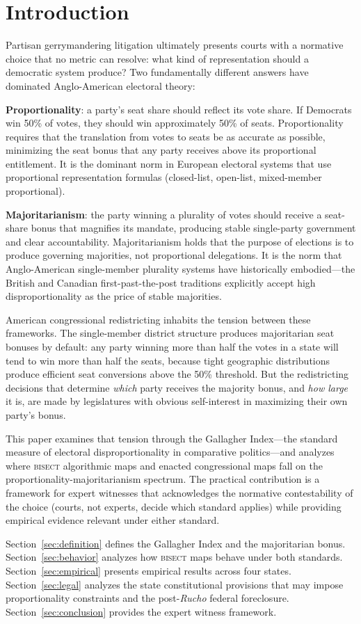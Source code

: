 \section{Introduction}
\label{sec:introduction}

Partisan gerrymandering litigation ultimately presents courts with a normative
choice that no metric can resolve: what kind of representation should a democratic
system produce? Two fundamentally different answers have dominated Anglo-American
electoral theory:

\textbf{Proportionality}: a party's seat share should reflect its vote share.
If Democrats win 50\% of votes, they should win approximately 50\% of seats.
Proportionality requires that the translation from votes to seats be as accurate
as possible, minimizing the seat bonus that any party receives above its proportional
entitlement. It is the dominant norm in European electoral systems that use proportional
representation formulas (closed-list, open-list, mixed-member proportional).

\textbf{Majoritarianism}: the party winning a plurality of votes should receive
a seat-share bonus that magnifies its mandate, producing stable single-party
government and clear accountability. Majoritarianism holds that the purpose of
elections is to produce governing majorities, not proportional delegations.
It is the norm that Anglo-American single-member plurality systems have historically
embodied---the British and Canadian first-past-the-post traditions explicitly
accept high disproportionality as the price of stable majorities.

American congressional redistricting inhabits the tension between these frameworks.
The single-member district structure produces majoritarian seat bonuses by default:
any party winning more than half the votes in a state will tend to win more than
half the seats, because tight geographic distributions produce efficient seat
conversions above the 50\% threshold. But the redistricting decisions that determine
\textit{which} party receives the majority bonus, and \textit{how large} it is,
are made by legislatures with obvious self-interest in maximizing their own party's bonus.

This paper examines that tension through the Gallagher Index---the standard measure
of electoral disproportionality in comparative politics---and analyzes where
\textsc{bisect} algorithmic maps and enacted congressional maps fall on the
proportionality-majoritarianism spectrum. The practical contribution is a framework
for expert witnesses that acknowledges the normative contestability of the choice
(courts, not experts, decide which standard applies) while providing empirical
evidence relevant under either standard.

Section~\ref{sec:definition} defines the Gallagher Index and the majoritarian bonus.
Section~\ref{sec:behavior} analyzes how \textsc{bisect} maps behave under both
standards. Section~\ref{sec:empirical} presents empirical results across four states.
Section~\ref{sec:legal} analyzes the state constitutional provisions that may impose
proportionality constraints and the post-\textit{Rucho} federal foreclosure.
Section~\ref{sec:conclusion} provides the expert witness framework.
